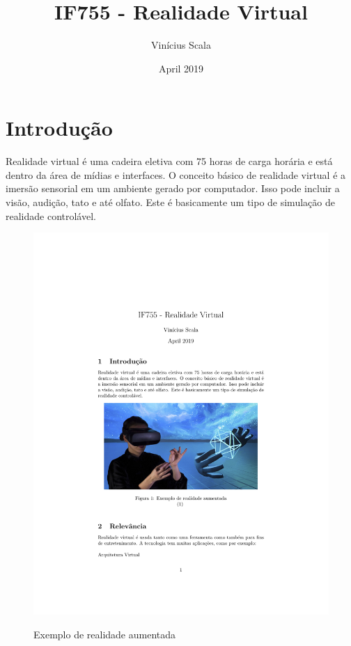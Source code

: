 \documentclass[10pt]{article}
\title{IF755 - Realidade Virtual}
\author{Vinícius Scala}
\date{April 2019}
\begin{document}
\maketitle

\section{Introdução}
Realidade virtual é uma cadeira eletiva com 75 horas de carga horária e está dentro da área de mídias e interfaces.
O conceito básico de realidade virtual é a imersão sensorial em um ambiente gerado por computador. Isso pode incluir a visão, audição, tato e até olfato. Este é basicamente um tipo de simulação de realidade controlável. 


\begin{figure}[h!]
\centering
\includegraphics[scale=0.3]{vsob}
\caption{Exemplo de realidade aumentada}\cite{imagem}
\label{fig:vsob}
\end{figure}
\end{document}
